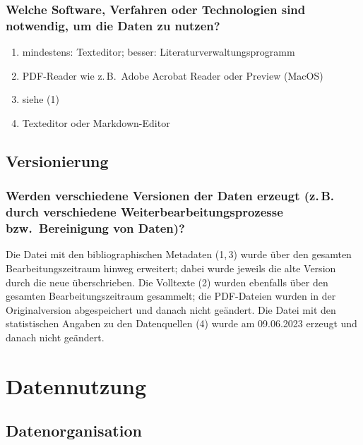 \documentclass[%
  11pt,
  DIV=16,
  a4paper,
  BCOR=15mm,
  twoside=on,
  bibliography=totoc,
  headings=normal,
  numbers=noendperiod,
]{scrartcl}
\begin{document}
\subsubsection{Welche Software, Verfahren oder Technologien sind notwendig, um die Daten zu nutzen?}

\begin{enumerate}[(1)]
  \item
    mindestens: Texteditor; besser: Literaturverwaltungsprogramm
  \item
    PDF-Reader wie z.\,B.\ Adobe Acrobat Reader oder Preview (MacOS)
  \item
    siehe (1)
  \item
    Texteditor oder Markdown-Editor
\end{enumerate}

\subsection{Versionierung}

\subsubsection{Werden verschiedene Versionen der Daten erzeugt (\texorpdfstring{z.\,B.}{z.B.} durch verschiedene Weiterbearbeitungsprozesse bzw.\ Bereinigung von Daten)?}


Die Datei mit den bibliographischen Metadaten (1,\,3) wurde über den gesamten Bearbeitungszeitraum hinweg erweitert;
dabei wurde jeweils die alte Version durch die neue überschrieben.
Die Volltexte (2) wurden ebenfalls über den gesamten Bearbeitungszeitraum gesammelt; die PDF-Dateien wurden in der Originalversion abgespeichert
und danach nicht geändert.
Die Datei mit den statistischen Angaben zu den Datenquellen (4) wurde am 09.06.2023 erzeugt und danach nicht geändert.

\section{Datennutzung}

\subsection{Datenorganisation}
\end{document}
